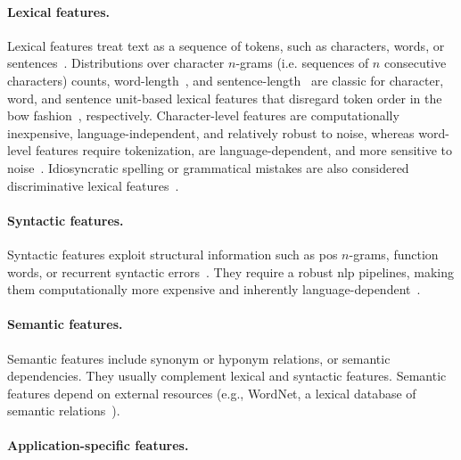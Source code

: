 \paragraph{Lexical features.} 
Lexical features treat text as a sequence of tokens, such as characters, words, or sentences~\citep{stamatatos_survey_2009}. 
Distributions over character $n$-grams (i.e. sequences of $n$ consecutive characters) counts, word-length~\citep{stein_intrinsic_2011}, and sentence-length~\citep{stein_intrinsic_2011,abbasi_writeprints_2008} are classic for character, word, and sentence unit-based lexical features that disregard token order in the \ac{bow} fashion~\citep{neal_surveying_2018}, respectively. 
Character-level features are computationally inexpensive, language-independent, and relatively robust to noise, whereas word-level features require tokenization, are language-dependent, and more sensitive to noise~\citep{stamatatos_survey_2009}.
Idiosyncratic spelling or grammatical mistakes are also considered discriminative lexical features~\citep{abbasi_writeprints_2008,neal_surveying_2018}. 

\paragraph{Syntactic features.}
Syntactic features exploit structural information such as \ac{pos} $n$-grams, function words, or recurrent syntactic errors~\citep{stamatatos_survey_2009,abbasi_writeprints_2008}.
They require a robust \ac{nlp} pipelines, making them computationally more expensive and inherently language-dependent~\citep{neal_surveying_2018,stamatatos_survey_2009}.

\paragraph{Semantic features.}
Semantic features include synonym or hyponym relations, or semantic dependencies. 
They usually complement lexical and syntactic features. 
Semantic features depend on external resources (e.g., WordNet, a lexical database of semantic relations~\citep{zhou_paraphrase_2025}).


\paragraph{Application-specific features.} %

